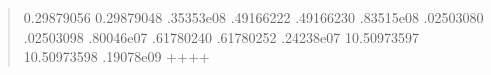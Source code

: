 \documentclass[letterpaper,10pt,english]{sphinxmanual}
\begin{document}
\begin{enumerate}
\begin{quote}
\begin{sphinxVerbatim}[commandchars=\\\{\}]
    \PYGZhy{}0.29879056          \PYGZhy{}0.29879048  .35353e\PYGZhy{}08 
     .49166222           .49166230  .83515e\PYGZhy{}08 
     .02503080           .02503098  .80046e\PYGZhy{}07 
     .61780240           .61780252  .24238e\PYGZhy{}07 
   \PYGZhy{}10.50973597         \PYGZhy{}10.50973598  .19078e\PYGZhy{}09 
+\PYGZhy{}\PYGZhy{}\PYGZhy{}\PYGZhy{}\PYGZhy{}\PYGZhy{}\PYGZhy{}\PYGZhy{}\PYGZhy{}\PYGZhy{}\PYGZhy{}\PYGZhy{}\PYGZhy{}\PYGZhy{}\PYGZhy{}\PYGZhy{}+\PYGZhy{}\PYGZhy{}\PYGZhy{}\PYGZhy{}\PYGZhy{}\PYGZhy{}\PYGZhy{}\PYGZhy{}\PYGZhy{}\PYGZhy{}\PYGZhy{}\PYGZhy{}\PYGZhy{}\PYGZhy{}\PYGZhy{}\PYGZhy{}\PYGZhy{}\PYGZhy{}\PYGZhy{}\PYGZhy{}\PYGZhy{}+\PYGZhy{}\PYGZhy{}\PYGZhy{}\PYGZhy{}\PYGZhy{}\PYGZhy{}\PYGZhy{}\PYGZhy{}\PYGZhy{}\PYGZhy{}\PYGZhy{}\PYGZhy{}\PYGZhy{}+


\end{sphinxVerbatim}
\end{quote}
\end{enumerate}
\end{document}
